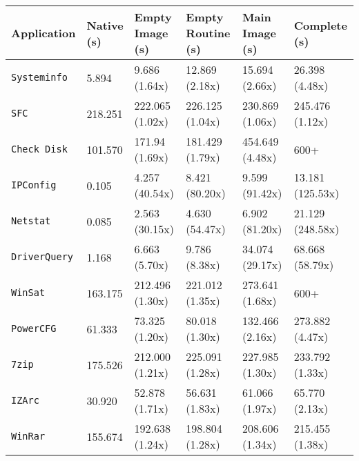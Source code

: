 \begin{sidewaystable}
\centering
\newcommand{\specialcell}[2][c]{%
  \begin{tabular}[#1]{@{}c@{}}#2\end{tabular}}
\begin{tabularx}{\linewidth}{*{6}{Y}}

\hline
\hline
   \textbf{Application} & \specialcell{ \textbf{Native} \\ \textbf{(s)}} & \specialcell{ \textbf{Empty Image} \\ \textbf{(s)}} & \specialcell{ \textbf{Empty Routine} \\ \textbf{(s)}} & \specialcell{ \textbf{Main Image} \\ \textbf{(s)}} & \specialcell{ \textbf{Complete} \\ \textbf{(s)}} \\
\hline
\texttt{Systeminfo}      & 5.894    & 9.686 (1.64x)  & 12.869 (2.18x) & 15.694 (2.66x) & 26.398 (4.48x)     \\
\texttt{SFC}          & 218.251 & 222.065 (1.02x) & 226.125 (1.04x) & 230.869 (1.06x) & 245.476 (1.12x)       \\
\texttt{Check Disk}       & 101.570     & 171.94 (1.69x) & 181.429 (1.79x) & 454.649 (4.48x) & 600+       \\
\texttt{IPConfig}       & 0.105     & 4.257 (40.54x) & 8.421 (80.20x) & 9.599 (91.42x) & 13.181 (125.53x)      \\
\texttt{Netstat} & 0.085 & 2.563 (30.15x) & 4.630 (54.47x) & 6.902 (81.20x) & 21.129 (248.58x)       \\
\texttt{DriverQuery} & 1.168 & 6.663 (5.70x) & 9.786 (8.38x) & 34.074 (29.17x) & 68.668 (58.79x)     \\
\texttt{WinSat}       & 163.175     & 212.496 (1.30x) & 221.012 (1.35x) & 273.641 (1.68x) & 600+      \\
\texttt{PowerCFG} & 61.333      & 73.325 (1.20x) & 80.018 (1.30x) & 132.466 (2.16x) & 273.882 (4.47x)       \\
\texttt{7zip}       & 175.526     & 212.000 (1.21x) & 225.091 (1.28x) & 227.985 (1.30x) & 233.792 (1.33x)      \\
\texttt{IZArc}      & 30.920     & 52.878 (1.71x) & 56.631 (1.83x) & 61.066 (1.97x) & 65.770 (2.13x)      \\
\texttt{WinRar} & 155.674 & 192.638 (1.24x) & 198.804 (1.28x) & 208.606 (1.34x) & 215.455 (1.38x)      \\

\end{tabularx}
\end{sidewaystable}
